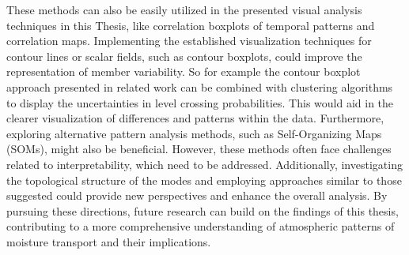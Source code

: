 These methods can also be easily utilized in the presented visual analysis techniques in this Thesis, like correlation boxplots of temporal patterns and correlation maps.
Implementing the established visualization techniques for contour lines or scalar fields, such as contour boxplots, could improve the representation of member variability.
So for example the contour boxplot approach presented in related work can be combined with clustering algorithms to display the uncertainties in level crossing probabilities. 
This would aid in the clearer visualization of differences and patterns within the data.
Furthermore, exploring alternative pattern analysis methods, such as Self-Organizing Maps (SOMs), might also be beneficial. 
However, these methods often face challenges related to interpretability, which need to be addressed.
Additionally, investigating the topological structure of the modes and employing approaches similar to those suggested  could provide new perspectives and enhance the overall analysis.
By pursuing these directions, future research can build on the findings of this thesis, contributing to a more comprehensive understanding of atmospheric patterns of moisture transport and their implications.
